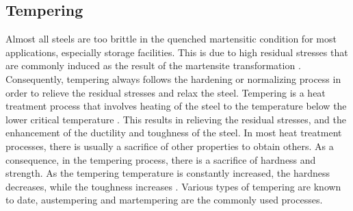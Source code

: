 \subsection{Tempering}  
Almost all steels are too brittle in the quenched martensitic condition for most applications, especially storage facilities. This is due to high residual stresses that are commonly induced as the result of the martensite transformation \cite{mampuya2021effect}. Consequently, tempering always follows the hardening or normalizing process in order to relieve the residual stresses and relax the steel. 
Tempering is a heat treatment process that involves heating of the steel to the temperature below the lower critical temperature \cite{singh2020applied}. This results in relieving the residual stresses, and the enhancement of the ductility and toughness of the steel. In most heat treatment processes, there is usually a sacrifice of other properties to obtain others. As a consequence, in the tempering process, there is a sacrifice of hardness and strength. As the tempering temperature is constantly increased, the hardness decreases, while the toughness increases \cite{singh2020applied}. Various types of tempering are known to date, austempering and martempering are the commonly used processes.

